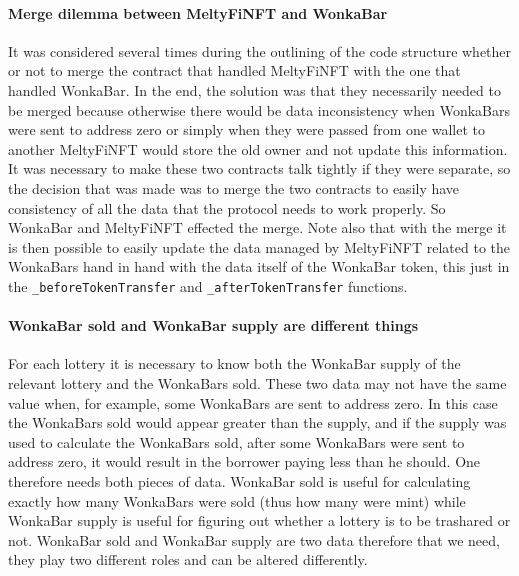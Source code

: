 \paragraph{Merge dilemma between MeltyFiNFT and WonkaBar}
It was considered several times during the outlining of the code structure whether or not to merge the contract that handled MeltyFiNFT with the one that handled WonkaBar. In the end, the solution was that they necessarily needed to be merged because otherwise there would be data inconsistency when WonkaBars were sent to address zero or simply when they were passed from one wallet to another MeltyFiNFT would store the old owner and not update this information. It was necessary to make these two contracts talk tightly
 if they were separate, so the decision that was made was to merge the two contracts to easily have consistency of all the data that the protocol needs to work properly. So WonkaBar and MeltyFiNFT effected the merge. Note also that with the merge it is then possible to easily update the data managed by MeltyFiNFT related to the WonkaBars hand in hand with the data itself of the WonkaBar token, this just in the \texttt{\_beforeTokenTransfer} and \texttt{\_afterTokenTransfer} functions.

\paragraph{WonkaBar sold and WonkaBar supply are different things}
For each lottery it is necessary to know both the WonkaBar supply of the relevant lottery and the WonkaBars sold. These two data may not have the same value when, for example, some WonkaBars are sent to address zero. In this case the WonkaBars sold would appear greater than the supply, and if the supply was used to calculate the WonkaBars sold, after some WonkaBars were sent to address zero, it would result in the borrower paying less than he should. One therefore needs both pieces of data. WonkaBar sold is useful for calculating exactly how many WonkaBars were sold (thus how many were mint) while WonkaBar supply is useful for figuring out whether a lottery is to be trashared or not. WonkaBar sold and WonkaBar supply are two data therefore that we need, they play two different roles and can be altered differently.

